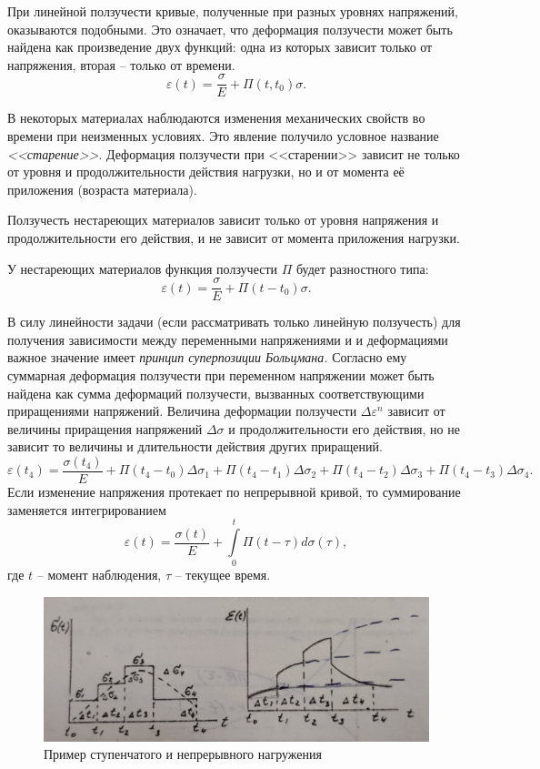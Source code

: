 \documentclass[a4paper,12pt]{article}
\begin{document}
При линейной ползучести кривые, полученные при разных уровнях напряжений, оказываются подобными. Это означает, что деформация ползучести может быть найдена как произведение двух функций: одна из которых зависит только от напряжения, вторая -- только от времени.
\[\varepsilon (t) = \frac{\sigma}{E} + \Pi (t, t_0) \sigma.\]

В некоторых материалах наблюдаются изменения механических свойств во времени при неизменных условиях. Это явление получило условное название \textit{<<старение>>}. Деформация ползучести при <<старении>> зависит не только от уровня и продолжительности действия нагрузки, но и от момента её приложения (возраста материала).

Ползучесть нестареющих материалов зависит только от уровня напряжения и продолжительности его действия, и не зависит от момента приложения нагрузки. 

У нестареющих материалов функция ползучести $\Pi$ будет разностного типа:
\[\varepsilon (t) = \frac{\sigma}{E} + \Pi (t - t_0) \sigma.\]

В силу линейности задачи (если рассматривать только линейную ползучесть) для получения зависимости между переменными напряжениями и и деформациями важное значение имеет \textit{принцип суперпозиции Больцмана.} Согласно ему суммарная деформация ползучести при переменном напряжении может быть найдена как сумма деформаций ползучести, вызванных соответствующими приращениями напряжений. Величина деформации ползучести $\Delta \varepsilon^n$ зависит от величины приращения напряжений $\Delta \sigma$ и продолжительности его действия, но не зависит то величины и длительности действия других приращений.
\[\varepsilon (t_4) = \frac{\sigma (t_4)}{E} + \Pi (t_4 - t_0) \Delta \sigma_1 + \Pi (t_4 - t_1) \Delta \sigma_2 + \Pi (t_4 - t_2) \Delta \sigma_3 + \Pi (t_4 - t_3) \Delta \sigma_4.\]
Если изменение напряжения протекает по непрерывной кривой, то суммирование заменяется интегрированием
\[\varepsilon (t) = \frac{\sigma (t)}{E} + \int\limits_0^t \Pi (t - \tau) d\sigma (\tau),\]
где $t$ -- момент наблюдения, $\tau$ -- текущее время.
\begin{figure}[H]\label{fig: Linear Polz}
    \centering
    \includegraphics[width = \textwidth]{Линейность ползучести.png}
    \caption{Пример ступенчатого и непрерывного нагружения}
\end{figure}
\end{document}
